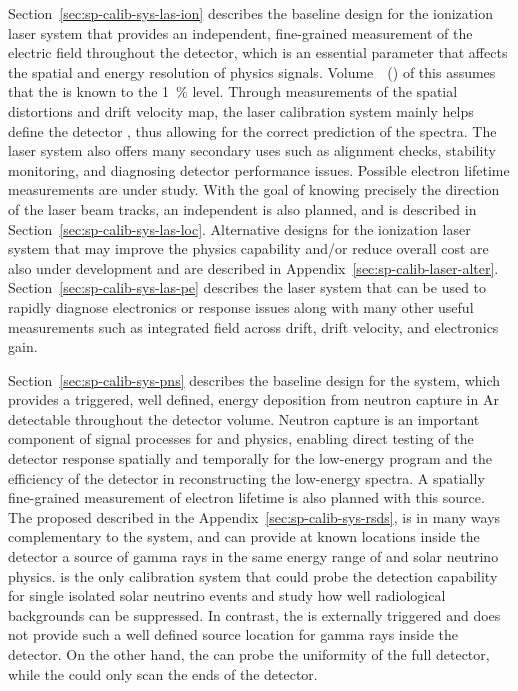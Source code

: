 Section~\ref{sec:sp-calib-sys-las-ion} describes the baseline design for the ionization laser system that provides an independent, fine-grained measurement of the electric field throughout the detector, which is an essential parameter that affects the spatial and energy resolution of physics signals. 
Volume~\volnumberphysics~(\voltitlephysics) of this 
assumes that the  is known to the \SI{1}{\%} level. Through measurements of the spatial distortions and drift velocity map, the laser calibration system mainly helps define the detector , thus allowing for the correct prediction of the  spectra. The laser system also offers many secondary uses such as alignment checks, stability monitoring, and diagnosing detector performance issues. 
Possible electron lifetime measurements are under study. 
With the goal of knowing precisely the direction of the laser beam tracks, an independent 
is also planned, and is described in Section~\ref{sec:sp-calib-sys-las-loc}.
Alternative designs for the ionization laser system that may improve the physics capability and/or reduce overall cost are also under development and are described in Appendix~\ref{sec:sp-calib-laser-alter}. %
Section~\ref{sec:sp-calib-sys-las-pe} describes the \phel laser system that can be used to rapidly diagnose electronics or  response issues along with many other useful measurements such as integrated field across drift, drift velocity, and electronics gain. 

Section~\ref{sec:sp-calib-sys-pns} describes the baseline design for the  system, which provides a triggered, well defined, energy deposition from neutron capture in Ar detectable throughout the detector volume. Neutron capture is an important component of signal processes for  and  physics, enabling direct testing of the detector response spatially and temporally for the low-energy program and the efficiency of the detector in reconstructing the low-energy spectra. A spatially fine-grained measurement of electron lifetime is also planned with this source.
The proposed  described in the Appendix~\ref{sec:sp-calib-sys-rsds}, 
is in many ways complementary to the 
system, and can provide at known locations inside the detector a source of gamma rays in the same energy range of  and solar neutrino physics. %
 is the only calibration system that could probe the detection capability for single isolated solar neutrino events and study how well radiological backgrounds can be suppressed. In contrast, the  is externally triggered and does not provide such a well defined source location for gamma rays inside the detector. On the other hand, the  can probe the uniformity of the full detector, while the  could only scan the ends of the detector. %


